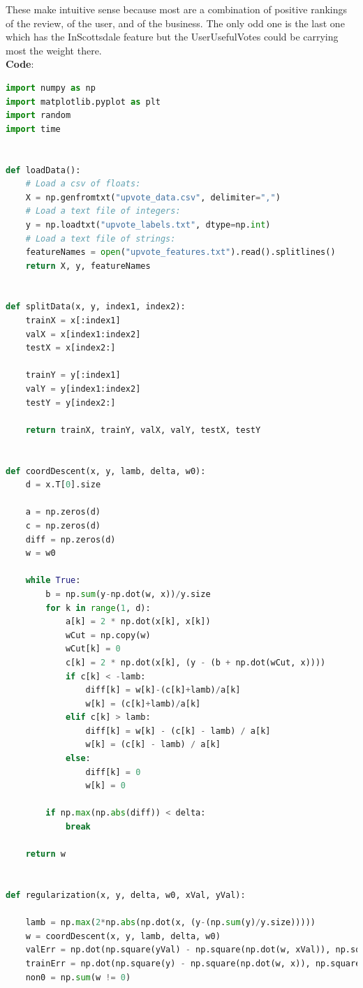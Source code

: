 \documentclass{article}
\newcommand{\1}{\mathbf{1}}
\begin{document}
These make intuitive sense because most are a combination of positive rankings of the review, of the user, and of the business. The only odd one is the last one which has the InScottsdale feature but the UserUsefulVotes could be carrying most the weight there.\\

\textbf{Code}:
\begin{lstlisting}[language=Python]
import numpy as np
import matplotlib.pyplot as plt
import random
import time


def loadData():
    # Load a csv of floats:
    X = np.genfromtxt("upvote_data.csv", delimiter=",")
    # Load a text file of integers:
    y = np.loadtxt("upvote_labels.txt", dtype=np.int)
    # Load a text file of strings:
    featureNames = open("upvote_features.txt").read().splitlines()
    return X, y, featureNames


def splitData(x, y, index1, index2):
    trainX = x[:index1]
    valX = x[index1:index2]
    testX = x[index2:]

    trainY = y[:index1]
    valY = y[index1:index2]
    testY = y[index2:]

    return trainX, trainY, valX, valY, testX, testY


def coordDescent(x, y, lamb, delta, w0):
    d = x.T[0].size

    a = np.zeros(d)
    c = np.zeros(d)
    diff = np.zeros(d)
    w = w0

    while True:
        b = np.sum(y-np.dot(w, x))/y.size
        for k in range(1, d):
            a[k] = 2 * np.dot(x[k], x[k])
            wCut = np.copy(w)
            wCut[k] = 0
            c[k] = 2 * np.dot(x[k], (y - (b + np.dot(wCut, x))))
            if c[k] < -lamb:
                diff[k] = w[k]-(c[k]+lamb)/a[k]
                w[k] = (c[k]+lamb)/a[k]
            elif c[k] > lamb:
                diff[k] = w[k] - (c[k] - lamb) / a[k]
                w[k] = (c[k] - lamb) / a[k]
            else:
                diff[k] = 0
                w[k] = 0

        if np.max(np.abs(diff)) < delta:
            break

    return w


def regularization(x, y, delta, w0, xVal, yVal):

    lamb = np.max(2*np.abs(np.dot(x, (y-(np.sum(y)/y.size)))))
    w = coordDescent(x, y, lamb, delta, w0)
    valErr = np.dot(np.square(yVal) - np.square(np.dot(w, xVal)), np.square(yVal) - np.square(np.dot(w, xVal)))
    trainErr = np.dot(np.square(y) - np.square(np.dot(w, x)), np.square(y) - np.square(np.dot(w, x)))
    non0 = np.sum(w != 0)


\end{lstlisting}
\end{document}
